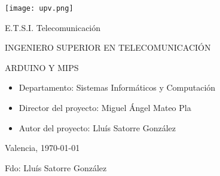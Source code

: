 

\begin{center}

  \texttt{[image: upv.png]} \\

  \vspace{2.0cm}

  \Large{E.T.S.I. Telecomunicación} \\

  \vspace{1.0cm}

  \large{INGENIERO SUPERIOR EN TELECOMUNICACIÓN} \\

  \vspace{2.0cm}

  \large{ARDUINO Y MIPS} \\

  \vspace{1.0cm}

\end{center}

\begin{itemize}
\item \large{Departamento: Sistemas Informáticos y Computación}
\item \large{Director del proyecto: Miguel Ángel Mateo Pla}
\item \large{Autor del proyecto: Lluís Satorre González}
\end{itemize}

\vspace{1.0cm}

\begin{flushright}
  \large{Valencia, \today} \\

  \vspace{2.5cm}

  \large{Fdo: Lluís Satorre González}
\end{flushright}
